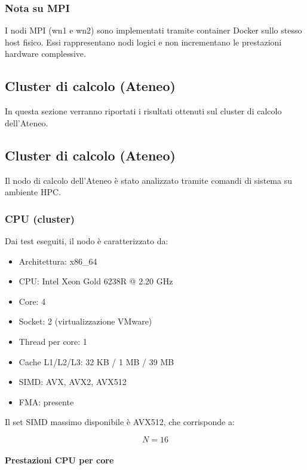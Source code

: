 \documentclass[a4paper,12pt]{article}
\begin{document}
\subsubsection{Nota su MPI}

I nodi MPI (wn1 e wn2) sono implementati tramite container Docker sullo stesso host fisico. Essi rappresentano nodi logici e non incrementano le prestazioni hardware complessive.

\subsection{Cluster di calcolo (Ateneo)}

In questa sezione verranno riportati i risultati ottenuti sul cluster di calcolo dell’Ateneo.

\subsection{Cluster di calcolo (Ateneo)}

Il nodo di calcolo dell’Ateneo è stato analizzato tramite comandi di sistema su ambiente HPC.

\subsubsection{CPU (cluster)}

Dai test eseguiti, il nodo è caratterizzato da:

\begin{itemize}
    \item Architettura: x86\_64
    \item CPU: Intel Xeon Gold 6238R @ 2.20 GHz
    \item Core: 4
    \item Socket: 2 (virtualizzazione VMware)
    \item Thread per core: 1
    \item Cache L1/L2/L3: 32 KB / 1 MB / 39 MB
    \item SIMD: AVX, AVX2, AVX512
    \item FMA: presente
\end{itemize}

Il set SIMD massimo disponibile è AVX512, che corrisponde a:

\[
N = 16
\]

\paragraph{Prestazioni CPU per core}
\end{document}
